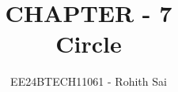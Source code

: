 \documentclass[journal]{IEEEtran}
\begin{document}

\vspace{3cm}

\title{CHAPTER - 7\\Circle}
\author{EE24BTECH11061 - Rohith Sai}
{\let\newpage\relax\maketitle}

\renewcommand{\thefigure}{\theenumi}
\renewcommand{\thetable}{\theenumi}
\setlength{\intextsep}{10pt} %

\renewcommand{\thetable}{\theenumi}
\end{document}
